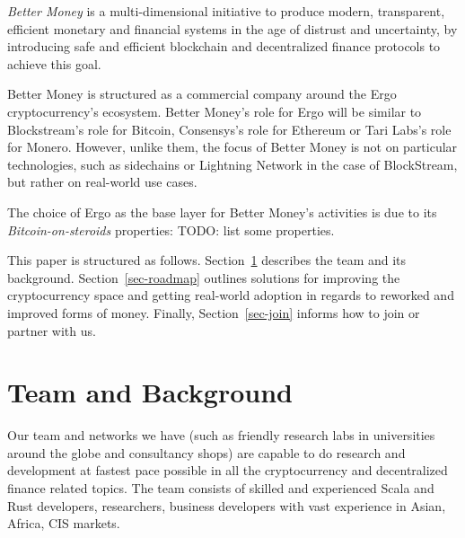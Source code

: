 \documentclass{llncs}   %
\begin{document}
\emph{Better Money} is a multi-dimensional initiative to produce modern, transparent, efficient monetary and financial systems in the age of distrust and uncertainty, by introducing safe and efficient blockchain and decentralized finance protocols to achieve this goal.

Better Money is structured as a commercial company around the Ergo cryptocurrency's ecosystem. Better Money's role for Ergo will be similar to Blockstream's role for Bitcoin, Consensys's role for Ethereum or Tari Labs's role for Monero. However, unlike them,
the focus of Better Money is not on particular technologies, such as sidechains or Lightning Network in the case of BlockStream, but rather on real-world use cases.

The choice of Ergo as the base layer for Better Money's activities is due to its \emph{Bitcoin-on-steroids} properties: TODO: list some properties.

This paper is structured as follows. Section~\ref{sec-team} describes the team and its background. Section~\ref{sec-roadmap}
outlines solutions for improving the cryptocurrency space and getting real-world adoption in regards to reworked and improved forms of money. Finally, Section~\ref{sec-join} informs how to join or partner with us.

\section{Team and Background}
\label{sec-team}

Our team and networks we have (such as friendly research labs in universities around the globe and consultancy shops) are
capable to do research and development at fastest pace possible in all the cryptocurrency and decentralized finance related
topics. The team consists of skilled and experienced Scala and Rust developers, researchers, business developers with
vast experience in Asian, Africa, CIS markets.
\end{document}
